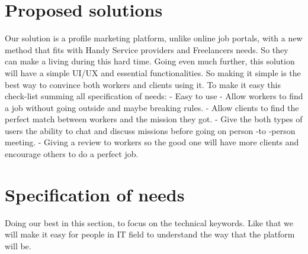 \documentclass[12pt]{report}
\begin{document}
\section{Proposed solutions}
Our solution is a profile marketing platform, unlike online job portals, with a new method that fits with Handy Service providers and Freelancers needs. So they can make a living during this hard time.
Going even much further, this solution will have a simple UI/UX and essential functionalities. So making it simple is the best way to convince both workers and clients using it.
To make it easy this check-list summing all specification of needs:\newline
- Easy to use \newline
- Allow workers to find a job without going outside and maybe breaking rules.\newline
- Allow clients to find the perfect match between workers and the mission they got.\newline
- Give the both types of users the ability to chat and discuss missions before going on person -to -person meeting.\newline
- Giving a review to workers so the good one will have more clients and encourage others to do a perfect job.

\section{Specification of needs}
Doing our best in this section, to focus on the technical keywords. Like that we will make it easy for people in IT field to understand the way that the platform will be.
\end{document}
